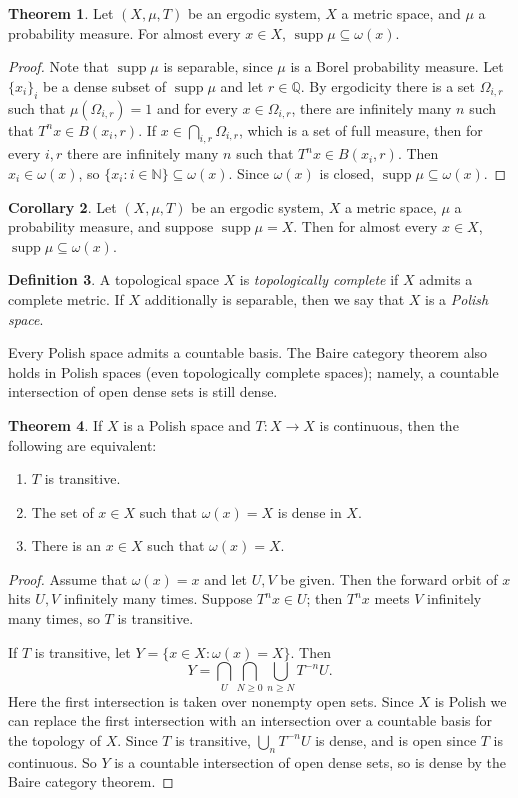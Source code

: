\documentclass[12pt]{report}
\newcommand{\NN}{\mathbb{N}}
\newcommand{\QQ}{\mathbb{Q}}
\newcommand{\supp}{\operatorname{supp}}
\newcommand{\dfn}[1]{\emph{#1}\index{#1}}
\theoremstyle{definition}
\newtheorem{theorem}{Theorem}[chapter]
\newtheorem{corollary}[theorem]{Corollary}
\newtheorem{definition}[theorem]{Definition}
\begin{document}
\begin{theorem}
Let $(X, \mu, T)$ be an ergodic system, $X$ a metric space, and $\mu$ a probability measure. For almost every $x \in X$, $\supp \mu \subseteq \omega(x)$.
\end{theorem}
\begin{proof}
Note that $\supp \mu$ is separable, since $\mu$ is a Borel probability measure. Let $\{x_i\}_i$ be a dense subset of $\supp \mu$ and let $r \in \QQ$. By ergodicity there is a set $\Omega_{i,r}$ such that $\mu(\Omega_{i,r}) = 1$ and for every $x \in \Omega_{i,r}$, there are infinitely many $n$ such that $T^nx \in B(x_i, r)$.
If $x \in \bigcap_{i,r} \Omega_{i,r}$, which is a set of full measure, then for every $i,r$ there are infinitely many $n$ such that $T^nx \in B(x_i, r)$.
Then $x_i \in \omega(x)$, so $\{x_i: i \in \NN\} \subseteq \omega(x)$. Since $\omega(x)$ is closed, $\supp \mu \subseteq \omega(x)$.
\end{proof}

\begin{corollary}
Let $(X, \mu, T)$ be an ergodic system, $X$ a metric space, $\mu$ a probability measure, and suppose $\supp \mu = X$. Then for almost every $x \in X$, $\supp \mu \subseteq \omega(x)$.
\end{corollary}

\begin{definition}
A topological space $X$ is \dfn{topologically complete} if $X$ admits a complete metric. If $X$ additionally is separable, then we say that $X$ is a \dfn{Polish space}.
\end{definition}
Every Polish space admits a countable basis. The Baire category theorem also holds in Polish spaces (even topologically complete spaces); namely, a countable intersection of open dense sets is still dense.
\begin{theorem}
If $X$ is a Polish space and $T: X \to X$ is continuous, then the following are equivalent:
\begin{enumerate}
\item $T$ is transitive.
\item The set of $x \in X$ such that $\omega(x) = X$ is dense in $X$.
\item There is an $x \in X$ such that $\omega(x) = X$.
\end{enumerate}
\end{theorem}
\begin{proof}
Assume that $\omega(x) = x$ and let $U,V$ be given. Then the forward orbit of $x$ hits $U,V$ infinitely many times. Suppose $T^nx \in U$; then $T^nx$ meets $V$ infinitely many times, so $T$ is transitive.

If $T$ is transitive, let $Y = \{x \in X: \omega(x) = X\}$. Then
$$Y = \bigcap_U \bigcap_{N \geq 0} \bigcup_{n \geq N} T^{-n} U.$$
Here the first intersection is taken over nonempty open sets. Since $X$ is Polish we can replace the first intersection with an intersection over a countable basis for the topology of $X$.
Since $T$ is transitive, $\bigcup_n T^{-n}U$ is dense, and is open since $T$ is continuous. So $Y$ is a countable intersection of open dense sets, so is dense by the Baire category theorem.
\end{proof}
\end{document}
